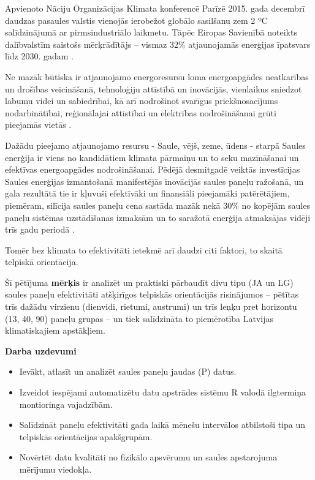 Apvienoto Nāciju Organizācijas Klimata konferencē Parīzē 2015. gada decembrī daudzas pasaules valstis vienojās ierobežot globālo sasilšanu zem 2 ºC salīdzinājumā ar pirmsindustriālo laikmetu.
Tāpēc Eiropas Savienībā noteikts dalībvalstīm saistošs mērķrādītājs  –  vismaz 32\%  atjaunojamās enerģijas īpatsvars līdz 2030. gadam \cite{ES}.

Ne mazāk būtiska ir atjaunojamo energoresursu loma energoapgādes neatkarības un drošības veicināšanā, tehnoloģiju attīstībā un inovācijās, vienlaikus sniedzot labumu videi un sabiedrībai, kā arī nodrošinot svarīgus priekšnosacījums nodarbinātībai, reģionālajai attīstībai un elektrības nodrošināšanai grūti pieejamās vietās \cite{ES}.

Dažādu pieejamo atjaunojamo resursu - Saule, vējš, zeme, ūdens - starpā Saules enerģija ir viens no kandidātiem klimata pārmaiņu un to seku mazināšanai un efektīvas energoapgādes nodrošināšanai. Pēdējā desmitgadē veiktās investīcijas Saules enerģijas izmantošanā manifestējās inovācijās saules paneļu ražošanā, un gala rezultātā tie ir kļuvuši efektīvāki un finansiāli pieejamāki patērētājiem, piemēram, silīcija saules paneļu cena sastāda mazāk nekā 30\% no kopējām saules paneļu sistēmas uzstādīšanas izmaksām un to saražotā enerģija atmaksājas vidēji trīs gadu periodā \cite{researchOpp}.

Tomēr bez klimata to efektivitāti ietekmē arī daudzi citi faktori, to skaitā telpiskā orientācija.

Šī pētījuma \textbf{mērķis} ir analizēt un praktiski pārbaudīt divu tipu (JA un LG) saules paneļu efektivitāti atšķirīgos telpiskās orientācijās risinājumos -- pētītas trīs dažādu virzienu (dienvidi, rietumi, austrumi) un trīs leņķu pret horizontu (13\textdegree, 40\textdegree, 90\textdegree) paneļu grupas -- un tiek salīdzināta to piemērotība Latvijas klimatiskajiem apstākļiem.

\textbf{Darba uzdevumi}
\begin{itemize}
\item Ievākt, atlasīt un analizēt saules paneļu jaudas (P) datus.
\item Izveidot iespējami automatizētu datu apstrādes sistēmu R valodā ilgtermiņa montioringa vajadzībām.
\item Salīdzināt paneļu efektivitāti gada laikā mēnešu intervālos atbilstoši tipa un telpiskās orientācijas apakšgrupām.
\item Novērtēt datu kvalitāti no fizikālo apsvērumu un saules apstarojuma mērījumu viedokļa.
\end{itemize}

